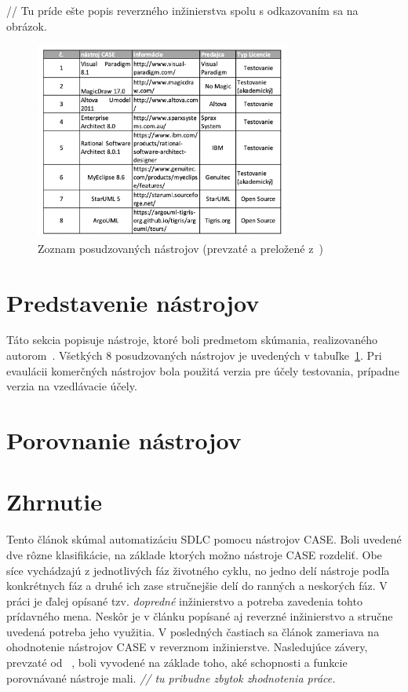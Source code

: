 \documentclass[10pt,twoside,slovak,a4paper]{article}
\begin{document}
// Tu príde ešte popis reverzného inžinierstva spolu s odkazovaním sa na obrázok.

\begin{figure}[ht]
\centering
\includegraphics[width=0.75\textwidth]{tabulka1.png}
\caption{Zoznam posudzovaných nástrojov (prevzaté a preložené z~\cite{Osman:RE})}
\label{tabulka1}
\end{figure}

\section{Predstavenie nástrojov}\label{predstavenie}


Táto sekcia popisuje nástroje, ktoré boli predmetom skúmania, realizovaného autorom~\cite{Osman:RE}. Všetkých 8 posudzovaných nástrojov je uvedených v tabuľke~\ref{tabulka1}. Pri evaulácii komerčných nástrojov bola použitá verzia pre účely testovania, prípadne verzia na vzedlávacie účely.

\section{Porovnanie nástrojov}\label{porovnanie}

\section{Zhrnutie} \label{zhrnutie} 
Tento článok skúmal automatizáciu SDLC pomocu nástrojov CASE. Boli uvedené dve rôzne klasifikácie, na základe ktorých možno nástroje CASE rozdeliť. Obe síce vychádzajú z jednotlivých fáz životného cyklu, no jedno delí nástroje podľa konkrétnych fáz a druhé ich zase stručnejšie delí do ranných a neskorých fáz.
V práci je ďalej opísané tzv. \emph{dopredné} inžinierstvo a potreba zavedenia tohto prídavného mena. Neskôr je v článku popísané aj reverzné inžinierstvo a stručne uvedená potreba jeho využitia. 
V posledných častiach sa článok zameriava na ohodnotenie nástrojov CASE v reverznom inžinierstve. Nasledujúce závery, prevzaté od~ \cite{Osman:RE}, boli vyvodené na základe toho, aké schopnosti a funkcie porovnávané nástroje mali.
\emph{// tu pribudne zbytok zhodnotenia práce.}






\end{document}
